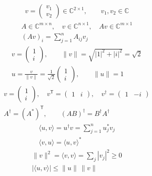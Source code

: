 \documentclass{article}
\begin{document}
\fontsize{28}{34}\selectfont
\null\vfill\[\begin{gathered}
v=\begin{pmatrix}v_1\\v_2\end{pmatrix}\in\mathbb C^{2\times1},\qquad v_1,v_2\in\mathbb C
\end{gathered}\]\vfill\null
\newpage
\null\vfill\[\begin{gathered}
A\in\mathbb C^{m\times n},\quad v\in\mathbb C^{n\times1},\quad Av\in\mathbb C^{m\times1}\\[12pt](Av)_i=\sum_{j=1}^{n}A_{ij}v_j
\end{gathered}\]\vfill\null
\newpage
\null\vfill\[\begin{gathered}
v=\begin{pmatrix}1\\ i\end{pmatrix},\qquad \|v\|=\sqrt{|1|^2+|i|^2}=\sqrt2\\[12pt]u=\frac{v}{\|v\|}=\frac1{\sqrt2}\begin{pmatrix}1\\ i\end{pmatrix},\qquad\|u\|=1
\end{gathered}\]\vfill\null
\newpage
\null\vfill\[\begin{gathered}
v=\begin{pmatrix}1\\i\end{pmatrix},\quad v^{\mathsf T}=\begin{pmatrix}1&i\end{pmatrix},\quad v^\dagger=\begin{pmatrix}1&-i\end{pmatrix}\\[12pt]A^\dagger=(A^*)^{\mathsf T},\qquad (AB)^\dagger=B^\dagger A^\dagger
\end{gathered}\]\vfill\null
\newpage
\null\vfill\[\begin{gathered}
\langle u,v\rangle=u^\dagger v=\sum_{j=1}^{n}u_j^*v_j\\[12pt]\langle v,u\rangle=\langle u,v\rangle^*
\end{gathered}\]\vfill\null
\newpage
\null\vfill\[\begin{gathered}
\|v\|^2=\langle v,v\rangle=\sum_j|v_j|^2\geq0\\[12pt]|\langle u,v\rangle|\leq\|u\|\,\|v\|
\end{gathered}\]\vfill\null
\end{document}

